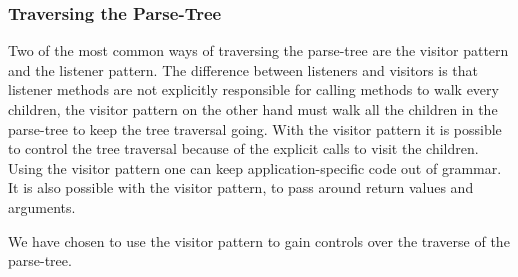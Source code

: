 
\subsubsection*{Traversing the Parse-Tree}
Two of the most common ways of traversing the parse-tree are the visitor pattern and the listener pattern. 
The difference between listeners and visitors is that listener methods are not explicitly responsible for calling methods to walk every children, the visitor pattern on the other hand must walk all the children in the parse-tree to keep the tree traversal going.
With the visitor pattern it is possible to control the tree traversal because of the explicit calls to visit the children. \citep{ANTLR4_Book}
Using the visitor pattern one can keep application-specific code out of grammar.
It is also possible with the visitor pattern, to pass around return values and arguments.

We have chosen to use the visitor pattern to gain controls over the traverse of the parse-tree. 





